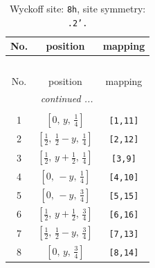 \documentclass[fleqn,8pt]{jsarticle}
\begin{document}
\begin{longtable}{ccc}
\caption{Wyckoff site: {\tt 8h}, site symmetry: {\tt .2'.}}
 \\
 \hline \hline
No. & position & mapping \\ \hline \endfirsthead

\multicolumn{2}{l}{\tablename\ \thetable{}} \\
 \hline \hline
No. & position & mapping \\ \hline \endhead

 \hline \hline
\multicolumn{2}{r}{\footnotesize\it continued ...} \\ \endfoot

 \hline \hline
\multicolumn{2}{r}{} \\ \endlastfoot

1 & $\left[ 0,\, y,\, \frac{1}{4} \right]$ & {\tt [1,11]} \\ \hline
2 & $\left[ \frac{1}{2},\, \frac{1}{2} - y,\, \frac{1}{4} \right]$ & {\tt [2,12]} \\ \hline
3 & $\left[ \frac{1}{2},\, y + \frac{1}{2},\, \frac{1}{4} \right]$ & {\tt [3,9]} \\ \hline
4 & $\left[ 0,\, - y,\, \frac{1}{4} \right]$ & {\tt [4,10]} \\ \hline
5 & $\left[ 0,\, - y,\, \frac{3}{4} \right]$ & {\tt [5,15]} \\ \hline
6 & $\left[ \frac{1}{2},\, y + \frac{1}{2},\, \frac{3}{4} \right]$ & {\tt [6,16]} \\ \hline
7 & $\left[ \frac{1}{2},\, \frac{1}{2} - y,\, \frac{3}{4} \right]$ & {\tt [7,13]} \\ \hline
8 & $\left[ 0,\, y,\, \frac{3}{4} \right]$ & {\tt [8,14]} \\
\end{longtable}
\renewcommand{\arraystretch}{1.2}
\end{document}

